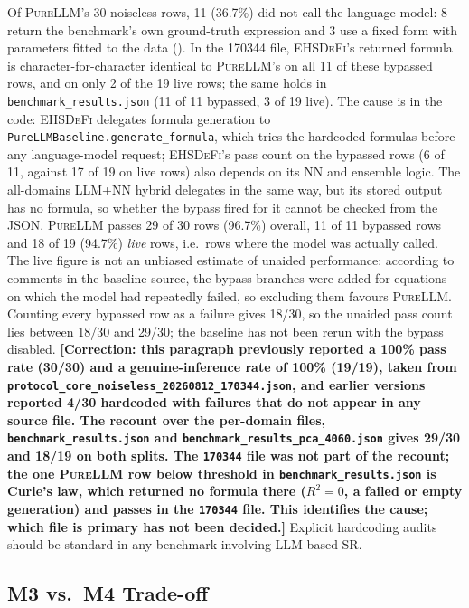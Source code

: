 \documentclass[twoside,11pt]{article}
\newcommand{\PureLLM}{\textsc{PureLLM}}
\newcommand{\EHD}{\textsc{EHSDeFi}}
\newcommand{\Rsq}{R^{2}}
\begin{document}
Of \PureLLM{}'s 30 noiseless rows, 11 (36.7\%) did not call the language model: 8 return the benchmark's own
ground-truth expression and 3 use a fixed form with parameters fitted to the data
(). In the 170344 file, \EHD{}'s returned formula is character-for-character identical to \PureLLM{}'s on all 11 of these bypassed rows, and on only 2 of the 19 live rows; the same holds in \texttt{benchmark\_results.json} (11 of 11 bypassed, 3 of 19 live). The cause is in the code: \EHD{} delegates formula generation to \texttt{PureLLMBaseline.generate\_formula}, which tries the hardcoded formulas before any language-model request; \EHD{}'s pass count on the bypassed rows (6 of 11, against 17 of 19 on live rows) also depends on its NN and ensemble logic. The all-domains LLM+NN hybrid delegates in the same way, but its stored output has no formula, so whether the bypass fired for it cannot be checked from the JSON. \PureLLM{} passes 29 of 30 rows (96.7\%) overall, 11 of 11 bypassed rows and 18 of 19
(94.7\%) \emph{live} rows, i.e.\ rows where the model was actually called. The live figure is not an unbiased
estimate of unaided performance: according to comments in the baseline source, the bypass branches were added for
equations on which the model had repeatedly failed, so excluding them favours \PureLLM{}. Counting every bypassed
row as a failure gives 18/30, so the unaided pass count lies between 18/30 and 29/30; the baseline has not been rerun
with the bypass disabled.
\textbf{[Correction: this paragraph previously reported a 100\% pass rate (30/30) and a genuine-inference rate of
100\% (19/19), taken from \texttt{protocol\_core\_noiseless\_20260812\_170344.json}, and earlier versions reported
4/30 hardcoded with failures that do not appear in any source file. The recount over the per-domain files,
\texttt{benchmark\_results.json} and \texttt{benchmark\_results\_pca\_4060.json} gives 29/30 and 18/19 on both splits.
The \texttt{170344} file was not part of the recount; the one \PureLLM{} row below threshold in \texttt{benchmark\_results.json} is Curie's law, which returned no
formula there ($\Rsq=0$, a failed or empty generation) and passes in the \texttt{170344} file. This identifies the cause; which file
is primary has not been decided.]}
Explicit hardcoding audits should be standard in any
benchmark involving LLM-based SR.

\subsection{M3 vs.\ M4 Trade-off}
\end{document}
